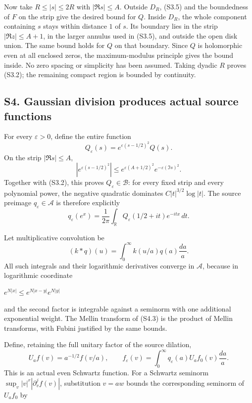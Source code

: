 \documentclass[
]{article}
\begin{document}
Now take \(R\le|s|\le2R\) with \(|\Re s|\le A\). Outside \(D_R\), (S3.5)
and the boundedness of \(F\) on the strip give the desired bound for
\(Q\). Inside \(D_R\), the whole component containing \(s\) stays within
distance \(1\) of \(s\). Its boundary lies in the strip
\(|\Re z|\le A+1\), in the larger annulus used in (S3.5), and outside
the open disk union. The same bound holds for \(Q\) on that boundary.
Since \(Q\) is holomorphic even at all enclosed zeros, the
maximum-modulus principle gives the bound inside. No zero spacing or
simplicity has been assumed. Taking dyadic \(R\) proves (S3.2); the
remaining compact region is bounded by continuity.

\subsection{S4. Gaussian division produces actual source
functions}\label{s4.-gaussian-division-produces-actual-source-functions}

For every \(\varepsilon>0\), define the entire function \[
Q_\varepsilon(s)=e^{\varepsilon(s-1/2)^2}Q(s).
\tag{S4.1}
\] On the strip \(|\Re s|\le A\), \[
|e^{\varepsilon(s-1/2)^2}|
\le e^{\varepsilon(A+1/2)^2}e^{-\varepsilon(\Im s)^2}.
\] Together with (S3.2), this proves \(Q_\varepsilon\in\mathcal B\): for
every fixed strip and every polynomial power, the negative quadratic
dominates \(C|t|^{3/2}\log|t|\). The source preimage
\(q_\varepsilon\in\mathcal A\) is therefore explicitly \[
q_\varepsilon(e^x)=\frac1{2\pi}\int_{\mathbb R}
Q_\varepsilon(1/2+it)e^{-itx}\,dt.
\tag{S4.2}
\]

Let multiplicative convolution be \[
(k*q)(u)=\int_0^\infty k(u/a)q(a)\frac{da}{a}.
\tag{S4.3}
\] All such integrals and their logarithmic derivatives converge in
\(\mathcal A\), because in logarithmic coordinate

\(e^{N|x|}\le e^{N|x-y|}e^{N|y|}\)

and the second factor is integrable against a seminorm with one
additional exponential weight. The Mellin transform of (S4.3) is the
product of Mellin transforms, with Fubini justified by the same bounds.

Define, retaining the full unitary factor of the source dilation, \[
U_a f(v)=a^{-1/2}f(v/a),\qquad
f_\varepsilon(v)=\int_0^\infty q_\varepsilon(a)U_a f_0(v)\frac{da}{a}.
\tag{S4.4}
\] This is an actual even Schwartz function. For a Schwartz seminorm
\(\sup_v |v|^r|\partial_v^j f(v)|\), substitution \(v=aw\) bounds the
corresponding seminorm of \(U_a f_0\) by
\end{document}
